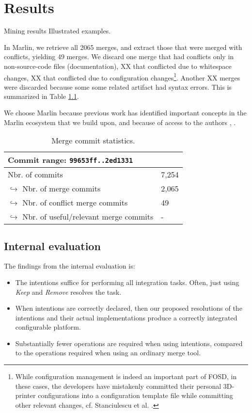 \chapter{Results}

Mining results
Illustrated examples.

In Marlin, we retrieve all 2065 merges, and extract those that were merged with conflicts, yielding 49 merges. We discard one merge that had conflicts only in non-source-code files (documentation), XX that conflicted due to whitespace changes, XX that conflicted due to configuration changes\footnote{While configuration management is indeed an important part of FOSD, in these cases, the developers have mistakenly committed their personal 3D-printer configurations into a configuration template file while committing other relevant changes, cf. Stanciulescu et al. \cite{stanciulescu2015}.}. Another XX merges were discarded because some some related artifact had syntax errors. This is summarized in Table \ref{tab:marlinmerge}.

We choose Marlin because previous work has identified important concepts in the Marlin ecosystem that we build upon, and because of access to the authors \cite{stanciulescu2015}, \cite{stanciulescu2016concepts}.

\begin{table}[h]
    \centering
    \caption{Merge commit statistics.}
    \label{tab:marlinmerge}
    \begin{tabular}{l l}
    \hline\hline
        Commit range: \texttt{99653ff..2ed1331}& \\\hline
        Nbr. of commits & 7,254\\
        $\hookrightarrow$ Nbr. of merge commits & 2,065 \\
        \hspace{1em}$\hookrightarrow$ Nbr. of conflict merge commits & 49 \\
        \hspace{2em}$\hookrightarrow$ Nbr. of useful/relevant merge commits & - \\
    \hline\hline
    \end{tabular}
\end{table}


\section{Internal evaluation}
The findings from the internal evaluation is:

\begin{itemize}
    \item The intentions suffice for performing all integration tasks. Often, just using \textit{Keep} and \textit{Remove} resolves the task.
    \item When intentions are correctly declared, then our proposed resolutions of the intentions and their actual implementations produce a correctly integrated configurable platform.
    \item Substantially fewer operations are required when using intentions, compared to the operations required when using an ordinary merge tool.
\end{itemize}

